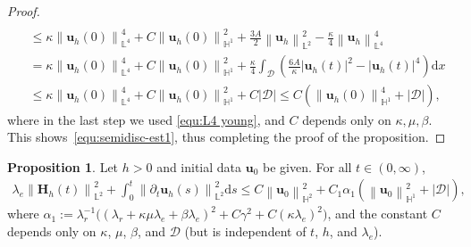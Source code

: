 \documentclass[11pt, reqno]{amsart}
\theoremstyle{definition}
\newtheorem{proposition}[theorem]{Proposition}
\theoremstyle{remark}
\numberwithin{equation}{section}
\newcommand{\bff}{\boldsymbol}
\newcommand{\bb}{\mathbb}
\newcommand{\dx}{\mathrm{d}x}
\newcommand{\ds}{\mathrm{d}s}
\newcommand{\norm}[2]{\left\|{#1}\right\|_{#2}}
\begin{document}
\begin{proof}
\begin{align}
	\\
	\nonumber
	&\leq
	\kappa \norm{\bff{u}_h(0)}{\bb{L}^4}^4
	+
	C \norm{\bff{u}_h(0)}{\bb{H}^1}^2
	+
	\frac{3A}{2} \norm{\bff{u}_h}{\bb{L}^2}^2
	-
	\frac{\kappa}{4} \norm{\bff{u}_h}{\bb{L}^4}^4
	\\
	\nonumber
	&=
	\kappa \norm{\bff{u}_h(0)}{\bb{L}^4}^4
	+
	C \norm{\bff{u}_h(0)}{\bb{H}^1}^2
	+
	\frac{\kappa}{4} \int_\mathscr{D} \left( \frac{6A}{\kappa} |\bff{u}_h(t)|^2 - |\bff{u}_h(t)|^4 \right) \dx
	\\
	&\leq
	\kappa \norm{\bff{u}_h(0)}{\bb{L}^4}^4
	+
	C \norm{\bff{u}_h(0)}{\bb{H}^1}^2
	+
	C |\mathscr{D}|
	\leq
	C \left( \norm{\bff{u}_h(0)}{\bb{H}^1}^4 + |\mathscr{D}| \right),
\end{align}
where in the last step we used \eqref{equ:L4 young}, and $C$ depends only on $\kappa, \mu, \beta$.
This shows~\eqref{equ:semidisc-est1}, thus completing the proof of the proposition.
\end{proof}

\begin{proposition}\label{pro:semidisc est2}
Let $h>0$ and initial data $\bff{u}_0$ be given. For all $t\in (0,\infty)$,
\begin{align}\label{equ:semidisc-est2}
	\lambda_e \norm{\bff{H}_h(t)}{\bb{L}^2}^2
	+ 
	\int_0^t \norm{\partial_t \bff{u}_h(s)}{\bb{L}^2}^2 \ds
	\leq 
	C\norm{\bff{u}_0}{\bb{H}^2}^2
	+
	C_1 \alpha_1 \left( \norm{\bff{u}_0}{\bb{H}^1}^2 + |\mathscr{D}| \right),
\end{align}
where $\alpha_1:= \lambda_r^{-1} \big((\lambda_r+\kappa \mu\lambda_e+\beta\lambda_e)^2 + C\gamma^2 + C(\kappa \lambda_e)^2\big)$, and the constant $C$ depends only on $\kappa$, $\mu$, $\beta$, and $\mathscr{D}$ (but is independent of $t$, $h$, and $\lambda_e$).
\end{proposition}
\end{document}
